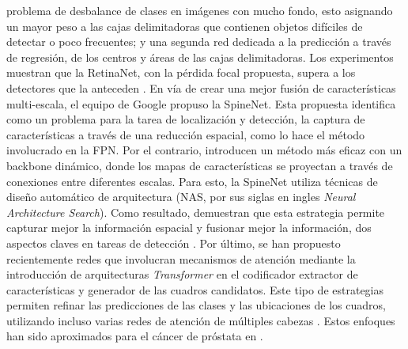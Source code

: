 problema de desbalance de clases en imágenes con mucho fondo, esto asignando un mayor peso a las cajas delimitadoras que contienen objetos difíciles de detectar o poco frecuentes; y una segunda red dedicada a la predicción a través de regresión, de los centros y áreas de las cajas delimitadoras. Los experimentos muestran que la RetinaNet, con la pérdida focal propuesta, supera a los detectores que la anteceden . 
En vía de crear una mejor fusión de características multi-escala, el equipo de Google propuso la SpineNet. Esta propuesta identifica como un problema para la tarea de localización y detección, la captura de características a través de una reducción espacial, como lo hace el método involucrado en la FPN. Por el contrario, introducen un método más eficaz con un backbone dinámico, donde los mapas de características se proyectan a través de conexiones entre diferentes escalas. Para esto, la SpineNet utiliza técnicas de diseño automático de arquitectura (NAS, por sus siglas en ingles \textit{Neural Architecture Search}). Como resultado, demuestran que esta estrategia permite capturar mejor la información espacial y fusionar mejor la información, dos aspectos claves en tareas de detección . Por último, se han propuesto recientemente redes que involucran mecanismos de atención mediante la introducción de arquitecturas \textit{Transformer} en el codificador extractor de características y generador de las cuadros candidatos. Este tipo de estrategias permiten refinar las predicciones de las clases y las ubicaciones de los cuadros, utilizando incluso varias redes de atención de múltiples cabezas . Estos enfoques han sido aproximados para el cáncer de próstata en .



